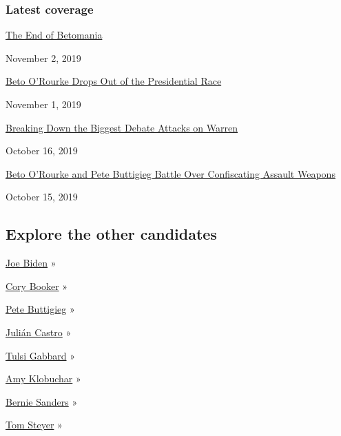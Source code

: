 \hypertarget{latest-coverage}{%
\subsubsection{Latest coverage}\label{latest-coverage}}

\href{https://www.nytimes.com/2019/11/02/us/politics/beto-orourke.html}{The
End of Betomania}

November 2, 2019

\href{https://www.nytimes.com/2019/11/01/us/politics/beto-orourke-drops-out.html}{Beto
O'Rourke Drops Out of the Presidential Race}

November 1, 2019

\href{https://www.nytimes.com/video/us/politics/100000006752156/post-debate-analysis.html}{Breaking
Down the Biggest Debate Attacks on Warren}

October 16, 2019

\href{https://www.nytimes.com/2019/10/15/us/politics/beto-guns.html}{Beto
O'Rourke and Pete Buttigieg Battle Over Confiscating Assault Weapons}

October 15, 2019

\hypertarget{explore-the-other-candidates}{%
\subsection{Explore the other
candidates}\label{explore-the-other-candidates}}

\href{https://www.nytimes.com/interactive/2020/us/elections/joe-biden.html}{Joe
Biden} »

\href{https://www.nytimes.com/interactive/2020/us/elections/cory-booker.html}{Cory
Booker} »

\href{https://www.nytimes.com/interactive/2020/us/elections/pete-buttigieg.html}{Pete
Buttigieg} »

\href{https://www.nytimes.com/interactive/2020/us/elections/julian-castro.html}{Julián
Castro} »

\href{https://www.nytimes.com/interactive/2020/us/elections/tulsi-gabbard.html}{Tulsi
Gabbard} »

\href{https://www.nytimes.com/interactive/2020/us/elections/amy-klobuchar.html}{Amy
Klobuchar} »

\href{https://www.nytimes.com/interactive/2020/us/elections/bernie-sanders.html}{Bernie
Sanders} »

\href{https://www.nytimes.com/interactive/2020/us/elections/tom-steyer.html}{Tom
Steyer} »

